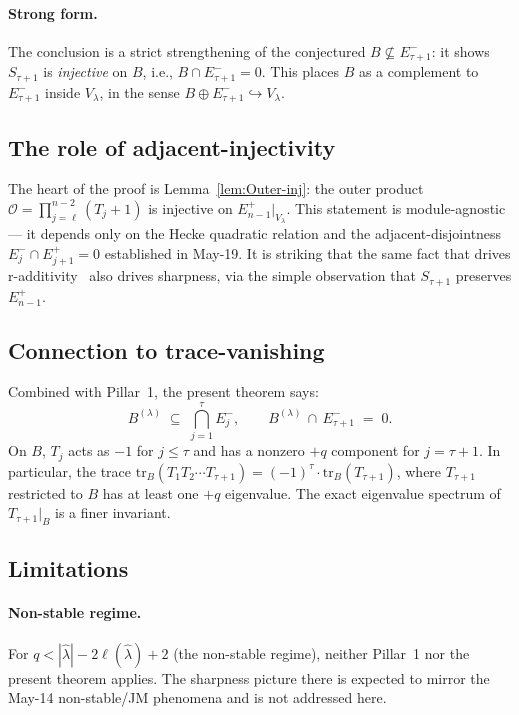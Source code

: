 \documentclass[11pt]{article}
\theoremstyle{definition}
\newcommand{\Vlam}{V_\lambda}
\newcommand{\hatl}{\widehat\lambda}
\newcommand{\elh}{\ell(\hatl)}
\newcommand{\Outer}{\mathcal{O}}
\begin{document}
\paragraph{Strong form.}
The conclusion is a strict strengthening of the conjectured
$B \not\subseteq E^-_{\tau+1}$: it shows $S_{\tau+1}$ is \emph{injective}
on $B$, i.e., $B \cap E^-_{\tau+1} = 0$. This places $B$ as a complement
to $E^-_{\tau+1}$ inside $\Vlam$, in the sense $B \oplus E^-_{\tau+1}
\hookrightarrow \Vlam$.

\subsection{The role of adjacent-injectivity}

The heart of the proof is Lemma~\ref{lem:Outer-inj}: the outer product
$\Outer = \prod_{j=\ell}^{n-2}(T_j+1)$ is injective on
$E^+_{n-1}|_{\Vlam}$. This statement is module-agnostic — it depends
only on the Hecke quadratic relation and the adjacent-disjointness
$E^-_j \cap E^+_{j+1} = 0$ established in May-19. It is striking that
the same fact that drives r-additivity~\cite{r-add} also drives
sharpness, via the simple observation that $S_{\tau+1}$ preserves
$E^+_{n-1}$.

\subsection{Connection to trace-vanishing}

Combined with Pillar~1, the present theorem says:
\[
   B^{(\lambda)} \;\subseteq\; \bigcap_{j=1}^\tau E^-_j,
   \qquad
   B^{(\lambda)} \,\cap\, E^-_{\tau+1} \;=\; 0.
\]
On $B$, $T_j$ acts as $-1$ for $j \le \tau$ and has a nonzero $+q$
component for $j = \tau + 1$. In particular, the trace
$\mathrm{tr}_{B}(T_1 T_2 \cdots T_{\tau+1}) = (-1)^\tau \cdot
\mathrm{tr}_B(T_{\tau+1})$, where $T_{\tau+1}$ restricted to $B$ has at
least one $+q$ eigenvalue. The exact eigenvalue spectrum of
$T_{\tau+1}|_B$ is a finer invariant.

\subsection{Limitations}

\paragraph{Non-stable regime.}
For $q < |\hatl| - 2\elh + 2$ (the non-stable regime), neither Pillar~1
nor the present theorem applies. The sharpness picture there is
expected to mirror the May-14 non-stable/JM phenomena and is not
addressed here.
\end{document}
